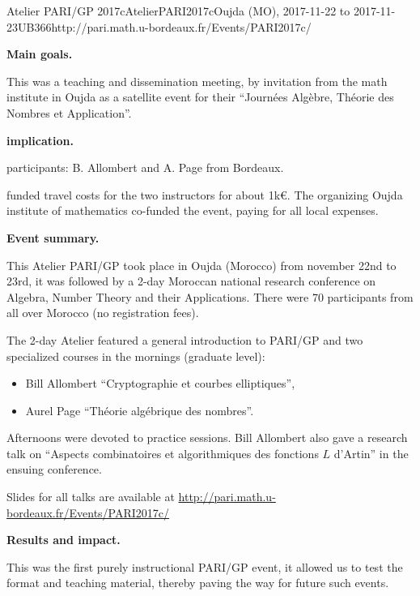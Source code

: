 \begin{event}{Atelier PARI/GP 2017c}{AtelierPARI2017c}{Oujda (MO),
2017-11-22 to 2017-11-23}{UB}{36}{6}{http://pari.math.u-bordeaux.fr/Events/PARI2017c/}

\textbf{Main goals.}

This was a teaching and dissemination meeting, by invitation from the math
institute in Oujda as a satellite event for their ``Journ\'ees Alg\`ebre,
  Th\'eorie des Nombres et Application''.

\textbf{\ODK implication.}

\ODK participants: B. Allombert and A. Page from Bordeaux.

\ODK funded travel costs for the two instructors for about 1k\euro. The
  organizing Oujda institute of mathematics co-funded the event, paying for
  all local expenses.

\textbf{Event summary.}

This Atelier PARI/GP took place in Oujda (Morocco) from november 22nd to
23rd, it was followed by a 2-day Moroccan national research conference on
  Algebra, Number Theory and their Applications. There were 70 participants
  from all over Morocco (no registration fees).

The 2-day Atelier featured a general introduction to PARI/GP and two
  specialized courses in the mornings (graduate level):
\begin{itemize}
\item Bill Allombert ``Cryptographie et courbes elliptiques'',
\item Aurel Page ``Th\'eorie alg\'ebrique des nombres''.
\end{itemize}
Afternoons were devoted to practice sessions. Bill Allombert also gave
  a research talk on ``Aspects combinatoires et algorithmiques des fonctions
  $L$ d'Artin'' in the ensuing conference.

Slides for all talks are available at
\url{http://pari.math.u-bordeaux.fr/Events/PARI2017c/}

\textbf{Results and impact.}

This was the first purely instructional PARI/GP event, it allowed us to test
the format and teaching material, thereby paving the way for future such events.
\end{event}
